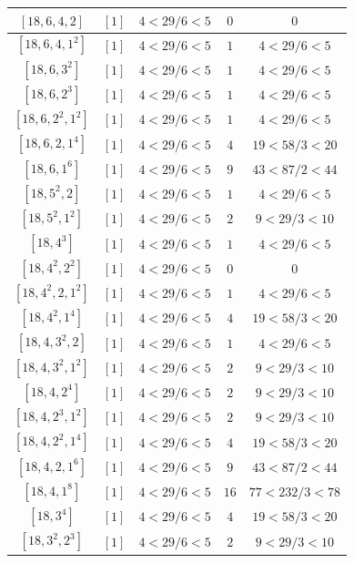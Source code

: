 \documentclass{article}%
\begin{document}
\begin{center}
\begin{longtable}{||c|c|c|c|c||}
$[18, 6, 4, 2]$ & $[1]$ & $4 < 29/6 < 5$ & $0$ & $0$ \\ \hline 
$[18, 6, 4, 1^{2}]$ & $[1]$ & $4 < 29/6 < 5$ & $1$ & $4 < 29/6 < 5$ \\ \hline 
$[18, 6, 3^{2}]$ & $[1]$ & $4 < 29/6 < 5$ & $1$ & $4 < 29/6 < 5$ \\ \hline 
$[18, 6, 2^{3}]$ & $[1]$ & $4 < 29/6 < 5$ & $1$ & $4 < 29/6 < 5$ \\ \hline 
$[18, 6, 2^{2}, 1^{2}]$ & $[1]$ & $4 < 29/6 < 5$ & $1$ & $4 < 29/6 < 5$ \\ \hline 
$[18, 6, 2, 1^{4}]$ & $[1]$ & $4 < 29/6 < 5$ & $4$ & $19 < 58/3 < 20$ \\ \hline 
$[18, 6, 1^{6}]$ & $[1]$ & $4 < 29/6 < 5$ & $9$ & $43 < 87/2 < 44$ \\ \hline 
$[18, 5^{2}, 2]$ & $[1]$ & $4 < 29/6 < 5$ & $1$ & $4 < 29/6 < 5$ \\ \hline 
$[18, 5^{2}, 1^{2}]$ & $[1]$ & $4 < 29/6 < 5$ & $2$ & $9 < 29/3 < 10$ \\ \hline 
$[18, 4^{3}]$ & $[1]$ & $4 < 29/6 < 5$ & $1$ & $4 < 29/6 < 5$ \\ \hline 
$[18, 4^{2}, 2^{2}]$ & $[1]$ & $4 < 29/6 < 5$ & $0$ & $0$ \\ \hline 
$[18, 4^{2}, 2, 1^{2}]$ & $[1]$ & $4 < 29/6 < 5$ & $1$ & $4 < 29/6 < 5$ \\ \hline 
$[18, 4^{2}, 1^{4}]$ & $[1]$ & $4 < 29/6 < 5$ & $4$ & $19 < 58/3 < 20$ \\ \hline 
$[18, 4, 3^{2}, 2]$ & $[1]$ & $4 < 29/6 < 5$ & $1$ & $4 < 29/6 < 5$ \\ \hline 
$[18, 4, 3^{2}, 1^{2}]$ & $[1]$ & $4 < 29/6 < 5$ & $2$ & $9 < 29/3 < 10$ \\ \hline 
$[18, 4, 2^{4}]$ & $[1]$ & $4 < 29/6 < 5$ & $2$ & $9 < 29/3 < 10$ \\ \hline 
$[18, 4, 2^{3}, 1^{2}]$ & $[1]$ & $4 < 29/6 < 5$ & $2$ & $9 < 29/3 < 10$ \\ \hline 
$[18, 4, 2^{2}, 1^{4}]$ & $[1]$ & $4 < 29/6 < 5$ & $4$ & $19 < 58/3 < 20$ \\ \hline 
$[18, 4, 2, 1^{6}]$ & $[1]$ & $4 < 29/6 < 5$ & $9$ & $43 < 87/2 < 44$ \\ \hline 
$[18, 4, 1^{8}]$ & $[1]$ & $4 < 29/6 < 5$ & $16$ & $77 < 232/3 < 78$ \\ \hline 
$[18, 3^{4}]$ & $[1]$ & $4 < 29/6 < 5$ & $4$ & $19 < 58/3 < 20$ \\ \hline 
$[18, 3^{2}, 2^{3}]$ & $[1]$ & $4 < 29/6 < 5$ & $2$ & $9 < 29/3 < 10$ \\ \hline 

\end{longtable}
\end{center}
\end{document}
